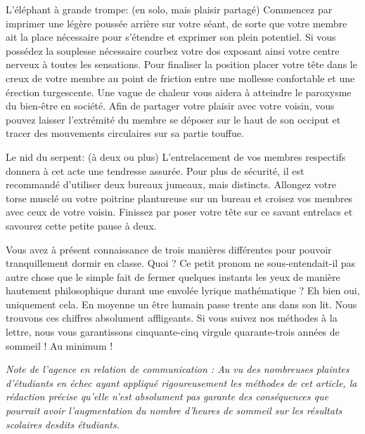 \begin{article*}
\begin{spacing}{.98}

L'éléphant à grande trompe: (en solo, mais plaisir partagé) Commencez par imprimer une légère poussée arrière sur votre séant, de sorte que votre membre ait la place nécessaire pour s'étendre et exprimer son plein potentiel. Si vous possédez la souplesse nécessaire courbez votre dos exposant ainsi votre centre nerveux à toutes les sensations. Pour finaliser la position placer votre tête dans le creux de votre membre au point de friction entre une mollesse confortable et une érection turgescente. Une vague de chaleur vous aidera à atteindre le paroxysme du bien-être en société. Afin de partager votre plaisir avec votre voisin, vous pouvez laisser l’extrémité du membre se déposer sur le haut de son occiput et tracer des mouvements circulaires sur sa partie touffue.

Le nid du serpent: (à deux ou plus) L’entrelacement de vos membres respectifs donnera à cet acte une tendresse assurée. Pour plus de sécurité, il est recommandé d'utiliser deux bureaux jumeaux, mais distincts. Allongez votre torse musclé ou votre poitrine plantureuse sur un bureau et croisez vos membres avec ceux de votre voisin. Finissez par poser votre tête sur ce savant entrelacs et savourez cette petite pause à deux.

 Vous avez à présent connaissance de trois manières différentes pour pouvoir tranquillement dormir en classe. Quoi ? Ce petit pronom ne sous-entendait-il pas autre chose que le simple fait de fermer quelques instants les yeux de manière hautement philosophique durant une envolée lyrique mathématique ? Eh bien oui, uniquement cela. En moyenne un être humain passe trente ans dans son lit. Nous trouvons ces chiffres absolument affligeants. Si vous suivez nos méthodes à la lettre, nous vous garantissons cinquante-cinq virgule quarante-trois années de sommeil ! Au minimum !

\textit{Note de l'agence en relation de communication : Au vu des nombreuses plaintes d'étudiants en échec ayant appliqué rigoureusement les méthodes de cet article, la rédaction précise qu'elle n'est absolument pas garante des conséquences que pourrait avoir l'augmentation du nombre d'heures de sommeil sur les résultats scolaires desdits étudiants.}

\vspace*{9mm}
\end{spacing}
\end{article*}
